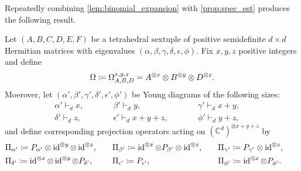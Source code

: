 \documentclass[notitlepage, 10pt]{article}
\begin{document}
Repeatedly combining \cref{lem:binomial_expansion} with \cref{prop:spec_est} produces the following result.
\begin{thm}
    Let $(A,B,C,D,E,F)$ be a tetrahedral sextuple of positive semidefinite $d\times d$ Hermitian matrices with eigenvalues $(\alpha,\beta,\gamma,\delta,\epsilon,\phi)$.
    Fix $x,y,z$ positive integers and define
    \begin{equation}
        \Omega \coloneqq \Omega_{A,B,D}^{x,y,z} = A^{\otimes x}\otimes B^{\otimes y} \otimes D^{\otimes z}.
    \end{equation}
    Moerover, let $(\alpha', \beta', \gamma', \delta', \epsilon', \phi')$ be Young diagrams of the following sizes:
    \begin{equation}
        \begin{alignedat}{3}
             &\alpha' \vdash_{d} x, \qquad 
            &&\beta' \vdash_{d} y, \qquad
            &&\gamma' \vdash_{d} x+y, \qquad\\
             &\delta' \vdash_{d} z, \qquad
            &&\epsilon' \vdash_{d} x+y+z, \qquad
            &&\phi' \vdash_{d} y+z,
        \end{alignedat}
    \end{equation}
    and define corresponding projection operators acting on $(\mathbb C^{d})^{\otimes x+y+z}$ by
    \begin{equation}
        \label{eq:extended_tilde_projs}
        \begin{alignedat}{3}
            &\Pi_{\alpha'} \coloneqq P_{\alpha'} \otimes \operatorname{id}^{\otimes y} \otimes \operatorname{id}^{\otimes z}, \qquad 
            &&\Pi_{\beta'} \coloneqq \operatorname{id}^{\otimes x} \otimes P_{\beta'} \otimes \operatorname{id}^{\otimes z}, \qquad
            &&\Pi_{\gamma'} \coloneqq P_{\gamma'} \otimes \operatorname{id}^{\otimes z}, \qquad\\
             &\Pi_{\delta'} \coloneqq \operatorname{id}^{\otimes x} \otimes \operatorname{id}^{\otimes y} \otimes P_{\delta'}, \qquad
            &&\Pi_{\epsilon'} \coloneqq P_{\epsilon'}, \qquad
            &&\Pi_{\phi'} \coloneqq \operatorname{id}^{\otimes x} \otimes P_{\phi'}.
        \end{alignedat}
    \end{equation}
\end{thm}
\end{document}
